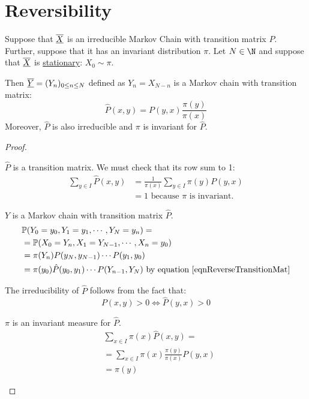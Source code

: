 \documentclass[../Main.tex]{subfiles}
\begin{document}
\section{Reversibility}
\begin{proposition}
    Suppose that $\chain{X}$ is an irreducible Markov Chain with transition matrix $P$. Further, suppose that it has an invariant distribution $\pi$. Let $N \in \N$ and suppose that $\chain{X}$ is \underline{stationary}: $X_0 \sim \pi$.

    Then $\chain{Y} = (Y_n)_{0 \leq n \leq N}$ defined as $Y_n = X_{N - n}$ is a Markov chain with transition matrix:
    \begin{equation}
        \hat{P}(x, y) = P(y, x) \frac{\pi(y)}{\pi(x)}
        \label{eqnReverseTransitionMat}
    \end{equation}
    Moreover, $\hat{P}$ is also irreducible and $\pi$ is invariant for $\hat{P}$.
    \label{propReverseChain}
\end{proposition}
\begin{proof}
    \begin{subproof}{$\hat{P}$ is a transition matrix.}
        We must check that its row sum to 1:
        \begin{align*}
            \sum_{y \in I} \hat{P}(x, y) &= \frac{1}{\pi(x)} \sum_{y \in I} \pi(y) P(y, x) \\
            &= 1 \text{ because $\pi$ is invariant.}
        \end{align*}
    \end{subproof}
    \begin{subproof}{$Y$ is a Markov chain with transition matrix $\hat{P}$.}
        \begin{align*}
            &\P(Y_0 = y_0, Y_1 = y_1, \cdots, Y_N = y_n) = \\
            &= \P(X_0 = Y_n, X_1 = Y_{N-1}, \cdots, X_n = y_0) \\
            &= \pi(Y_n) P(y_N, y_{N-1}) \cdots P(y_1, y_0) \\
            &= \pi(y_0) \hat{P}(y_0, y_1) \cdots P(Y_{n-1}, Y_N) \text{ by equation~\ref{eqnReverseTransitionMat}}
        \end{align*}
    \end{subproof}
    The irreducibility of $\hat{P}$ follows from the fact that:
    \begin{equation*}
        P(x, y) > 0 \iff \hat{P}(y, x) > 0
    \end{equation*}
    \begin{subproof}{$\pi$ is an invariant measure for $\hat{P}$.}
        \begin{align*}
            &\sum_{x \in I} \pi(x) \hat{P}(x, y) = \\
            &= \sum_{x \in I} \pi(x) \frac{\pi(y)}{\pi(x)} P(y, x) \\
            &= \pi(y)
        \end{align*}
    \end{subproof}
\end{proof}
\end{document}
